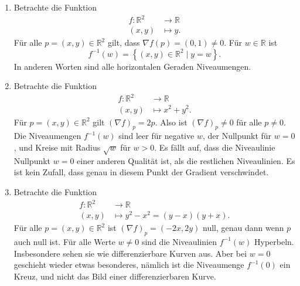 \documentclass[../main.tex]{subfiles}
\begin{document}
\begin{examples}
  \leavevmode
  \begin{enumerate}[(1)]
    \item Betrachte die Funktion
      \begin{align*}
        f \colon \mathbb{R}^2 & \to \mathbb{R} \\
        (x, y) & \mapsto y.
      \end{align*}
      Für alle $p = (x, y) \in \mathbb{R}^2$ gilt, dass
      ${\nabla f}(p) = (0, 1) \neq 0$.
      Für $w \in \mathbb{R}$ ist
      \[
        f^{-1}(w) = \left\{(x, y) \in \mathbb{R}^2 \mid y = w\right\}.
      \]
      In anderen Worten sind alle horizontalen Geraden
      Niveaumengen.
    \item Betrachte die Funktion
      \begin{align*}
        f \colon \mathbb{R}^2 & \to \mathbb{R} \\
        (x, y) & \mapsto x^2 + y^2.
      \end{align*}
      Für $p = (x, y) \in \mathbb{R}^2$ gilt
      ${(\nabla f)}_p = 2p$.
      Also ist ${(\nabla f)}_p \neq 0$ für alle $p \neq 0$.
      Die Niveaumengen $f^{-1}(w)$ sind leer für negative $w$,
      der Nullpunkt für $w = 0$, und Kreise mit Radius $\sqrt w$ 
      für $w > 0$.
      Es fällt auf, dass die Niveaulinie Nullpunkt $w = 0$ 
      einer anderen Qualität ist, als die restlichen Niveaulinien.
      Es ist kein Zufall, dass genau in diesem Punkt der
      Gradient verschwindet.

    \item Betrachte die Funktion
      \begin{align*}
        f \colon \mathbb{R}^2 & \to \mathbb{R} \\
        (x, y) & \mapsto y^2 - x^2 = (y - x)(y + x).
      \end{align*}
      Für alle $p = (x, y) \in \mathbb{R}^2$ ist
      ${(\nabla f)}_p = (-2x, 2y)$ null, genau dann wenn $p$ 
      auch null ist.
      Für alle Werte $w \neq 0$ sind die
      Niveaulinien $f^{-1}(w)$ Hyperbeln.
      Insbesondere sehen sie wie
      differenzierbare Kurven aus.
      Aber bei $w = 0$ geschieht wieder
      etwas besonderes, nämlich ist
      die Niveaumenge $f^{-1}(0)$ 
      ein Kreuz, und nicht das
      Bild einer differenzierbaren Kurve.
  \end{enumerate}
\end{examples}
\end{document}
